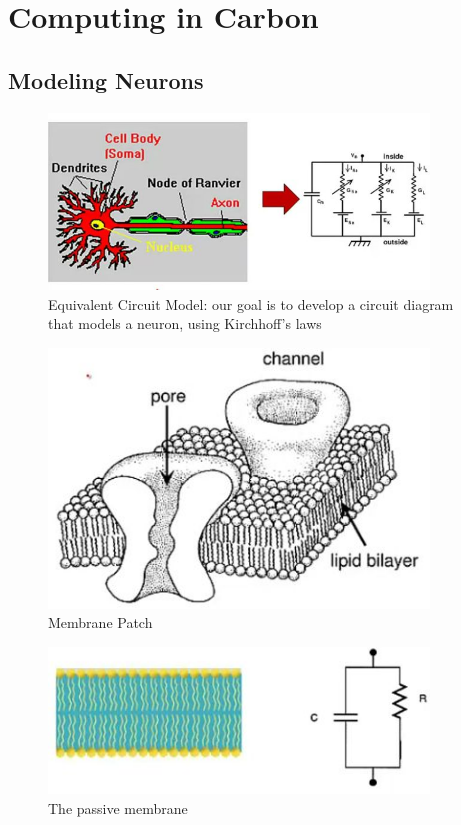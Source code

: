 \documentclass[]{article}
\begin{document}
\section{Computing in Carbon}\label{sec:week5}

\subsection{Modeling Neurons}

\begin{figure}[H]
	\caption[Equivalent Circuit Model]{Equivalent Circuit Model: our goal is to develop a circuit diagram that models a neuron, using Kirchhoff's laws}
	\includegraphics[width=0.9\textwidth]{equivalent-circuit-model}
\end{figure}

\begin{figure}[H]
	\caption[Membrane Patch]{Membrane Patch}
	\includegraphics[width=0.9\textwidth]{membrane-patch}
\end{figure}

\begin{figure}[H]
	\caption[The passive membrane]{The passive membrane}
	\includegraphics[width=0.9\textwidth]{passive-membrane}
\end{figure}
\end{document}
